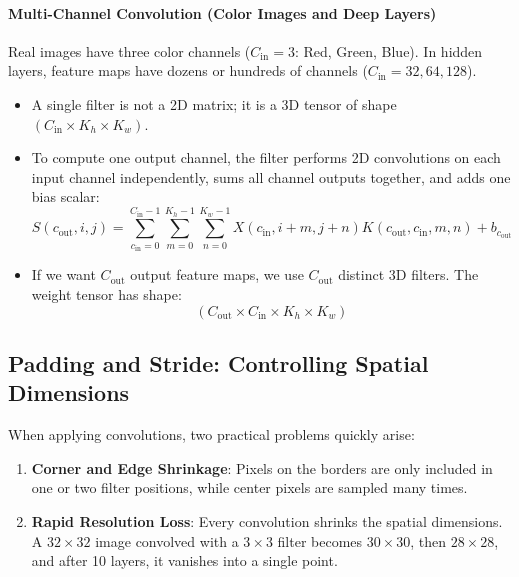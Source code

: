 \paragraph{Multi-Channel Convolution (Color Images and Deep Layers)}
Real images have three color channels ($C_{\text{in}} = 3$: Red, Green, Blue). In hidden layers, feature maps have dozens or hundreds of channels ($C_{\text{in}} = 32, 64, 128$).
\begin{itemize}
    \item A single filter is not a 2D matrix; it is a 3D tensor of shape $(C_{\text{in}} \times K_h \times K_w)$.
    \item To compute one output channel, the filter performs 2D convolutions on each input channel independently, sums all channel outputs together, and adds one bias scalar:
    \begin{equation}
    S(c_{\text{out}}, i, j) = \sum_{c_{\text{in}}=0}^{C_{\text{in}}-1} \sum_{m=0}^{K_h - 1} \sum_{n=0}^{K_w - 1} X(c_{\text{in}}, i + m, j + n) K(c_{\text{out}}, c_{\text{in}}, m, n) + b_{c_{\text{out}}}\label{eq:multichannel_conv}
    \end{equation}
    \item If we want $C_{\text{out}}$ output feature maps, we use $C_{\text{out}}$ distinct 3D filters. The weight tensor has shape:
    \begin{equation*}
    (C_{\text{out}} \times C_{\text{in}} \times K_h \times K_w)
    \end{equation*}
\end{itemize}

\subsection{Padding and Stride: Controlling Spatial Dimensions}\label{subsec:padding_stride}

When applying convolutions, two practical problems quickly arise:
\begin{enumerate}
    \item \textbf{Corner and Edge Shrinkage}: Pixels on the borders are only included in one or two filter positions, while center pixels are sampled many times.
    \item \textbf{Rapid Resolution Loss}: Every convolution shrinks the spatial dimensions. A $32 \times 32$ image convolved with a $3 \times 3$ filter becomes $30 \times 30$, then $28 \times 28$, and after 10 layers, it vanishes into a single point.
\end{enumerate}

